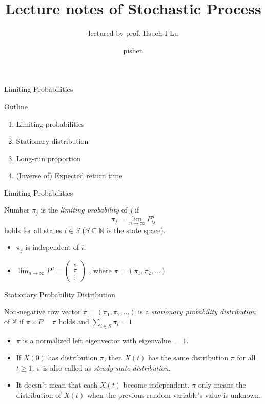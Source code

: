 \documentclass{beamer}
\title[Stochastic Process]{Lecture notes of Stochastic Process}
\subtitle{lectured by prof. Hsueh-I Lu}
\author{pishen}
\institute[AlgoLab]{AlgoLab, CSIE, NTU}
\begin{document}
\begin{frame}[plain]
	\titlepage
\end{frame}

\begin{frame}
	\begin{center}
		{\Huge Limiting Probabilities}
	\end{center}
\end{frame}

\begin{frame}{Outline}
	\begin{enumerate}
		\item Limiting probabilities
		\item Stationary distribution
		\item Long-run proportion
		\item (Inverse of) Expected return time
	\end{enumerate}
\end{frame}

\begin{frame}{Limiting Probabilities}
	\begin{definition}
		Number $\pi_j$ is the \textit{limiting probability} of $j$ if
		\[
		\pi_j = \lim_{n \to \infty} P^n_{ij}
		\]
		holds for all states $i \in S$ ($S \subseteq \mathbb{N}$ is the state space).
	\end{definition}
	\begin{itemize}
		\item $\pi_j$ is independent of $i$.
		\item $\lim_{n \to \infty} P^n = 
			\begin{pmatrix}
				\pi \\
				\pi \\
				\vdots
			\end{pmatrix}$
			, where $\pi = (\pi_1, \pi_2, \ldots)$
	\end{itemize}
\end{frame}

\begin{frame}{Stationary Probability Distribution}
	\begin{definition}
		Non-negative row vector $\pi = (\pi_1, \pi_2, \ldots)$
		is a \textit{stationary probability distribution} of $\mathbb{X}$
		if $\pi \times P = \pi$ holds and $\sum_{i \in S} \pi_i = 1$
	\end{definition}
	\begin{itemize}
		\item $\pi$ is a normalized left eigenvector with eigenvalue $=1$.
		\item If $X(0)$ has distribution $\pi$, then $X(t)$ has the same distribution $\pi$
			for all $t \geq 1$.
			$\pi$ is also called as \textit{steady-state distribution}.
		\item It doesn't mean that each $X(t)$ become independent.
			$\pi$ only means the distribution of $X(t)$ when the previous random variable's value is unknown.
	\end{itemize}
\end{frame}
\end{document}
